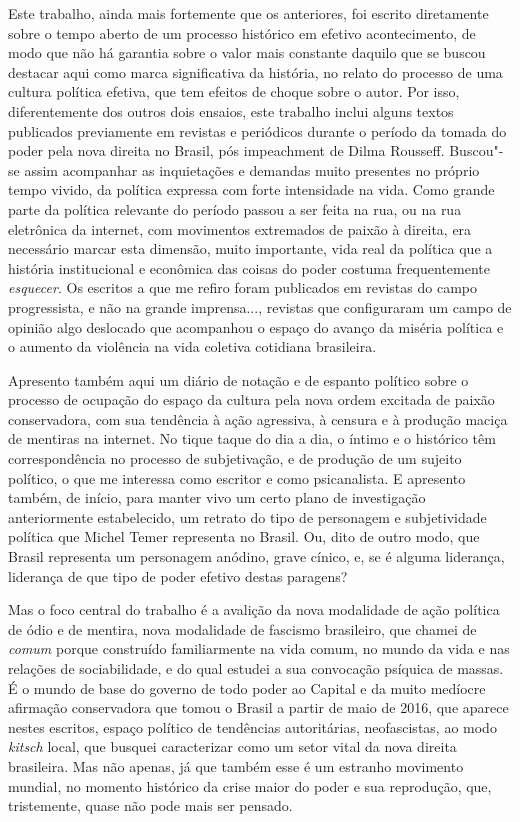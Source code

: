 Este trabalho, ainda mais fortemente que os anteriores, foi escrito
diretamente sobre o tempo aberto de um processo histórico em efetivo
acontecimento, de modo que não há garantia sobre o valor mais constante
daquilo que se buscou destacar aqui como marca significativa da
história, no relato do processo de uma cultura política efetiva, que tem
efeitos de choque sobre o autor. Por isso, diferentemente dos outros
dois ensaios, este trabalho inclui alguns textos publicados previamente
em revistas e periódicos durante o período da tomada do poder pela nova
direita no Brasil, pós impeachment de Dilma Rousseff. Buscou"-se assim
acompanhar as inquietações e demandas muito presentes no próprio tempo
vivido, da política expressa com forte intensidade na vida. Como grande
parte da política relevante do período passou a ser feita na rua, ou na
rua eletrônica da internet, com movimentos extremados de paixão à
direita, era necessário marcar esta dimensão, muito importante, vida
real da política que a história institucional e econômica das coisas do
poder costuma frequentemente \emph{esquecer}. Os escritos a que me
refiro foram publicados em revistas do campo progressista, e não na
grande imprensa..., revistas que configuraram um campo de opinião algo deslocado que
acompanhou o espaço do avanço da miséria política e o aumento da
violência na vida coletiva cotidiana brasileira.

Apresento também aqui um diário de notação e de espanto político sobre o
processo de ocupação do espaço da cultura pela nova ordem excitada de
paixão conservadora, com sua tendência à ação agressiva, à censura e à
produção maciça de mentiras na internet. No tique taque do dia a dia, o
íntimo e o histórico têm correspondência no processo de subjetivação, e
de produção de um sujeito político, o que me interessa como escritor
e como psicanalista. E apresento também, de início, para manter vivo um
certo plano de investigação anteriormente estabelecido, um retrato
do tipo de personagem e subjetividade política que Michel Temer
representa no Brasil. Ou, dito de outro modo, que Brasil representa um personagem
anódino, grave cínico, e, se é alguma liderança, liderança de
que tipo de poder efetivo destas paragens?

Mas o foco central do trabalho é a avalição da nova modalidade de ação
política de ódio e de mentira, nova modalidade de fascismo brasileiro,
que chamei de \emph{comum} porque construído familiarmente na vida
comum, no mundo da vida e nas relações de sociabilidade, e do qual
estudei a sua convocação psíquica de massas. É o mundo de base do
governo de todo poder ao Capital e da muito medíocre afirmação
conservadora que tomou o Brasil a partir de maio de 2016, que aparece
nestes escritos, espaço político de tendências autoritárias,
neofascistas, ao modo \emph{kitsch} local, que busquei caracterizar como um
setor vital da nova direita brasileira. Mas não apenas, já que também
esse é um estranho movimento mundial, no momento histórico da crise
maior do poder e sua reprodução, que, tristemente, quase não pode mais
ser pensado.


